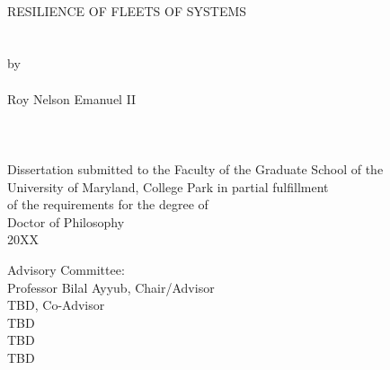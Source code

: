 
\thispagestyle{empty}
\hbox{\ }
\vspace{1in}
\renewcommand{\baselinestretch}{1}
\small\normalsize
\begin{center}

\large{{RESILIENCE OF FLEETS OF SYSTEMS}}\\
\ \\
\ \\
\large{by} \\
\ \\
\large{Roy Nelson Emanuel II}%
\ \\
\ \\
\ \\
\ \\
\normalsize
Dissertation submitted to the Faculty of the Graduate School of the \\
University of Maryland, College Park in partial fulfillment \\
of the requirements for the degree of \\
Doctor of Philosophy \\
20XX
\end{center}

\vspace{7.5em}

\noindent Advisory Committee: \\
Professor Bilal Ayyub, Chair/Advisor \\
TBD, Co-Advisor \\
TBD \\
TBD \\
TBD
